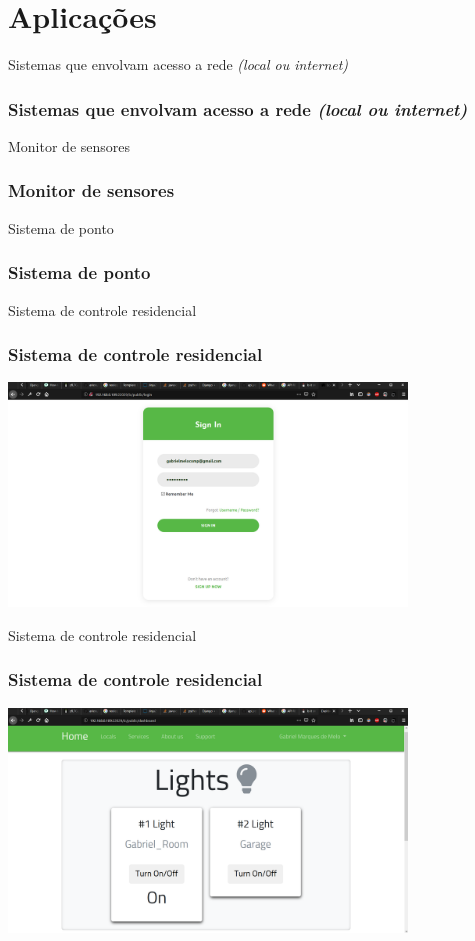 \documentclass[10pt, compress]{beamer}
\begin{document}
\section{Aplicações}

\begin{frame}{Sistemas que envolvam acesso a rede \textit{(local ou internet)}}
  \frametitle{Sistemas que envolvam acesso a rede \textit{(local ou internet)}}
\end{frame}

\begin{frame}{Monitor de sensores}
  \frametitle{Monitor de sensores}
\end{frame}

\begin{frame}{Sistema de ponto}
  \frametitle{Sistema de ponto}
\end{frame}

\begin{frame}{Sistema de controle residencial}
  \frametitle{Sistema de controle residencial}
  \includegraphics[width=300pt]{images/iot-server_login.png}
\end{frame}

\begin{frame}{Sistema de controle residencial}
  \frametitle{Sistema de controle residencial}
  \includegraphics[width=300pt]{images/iot-server_dash1.png}
\end{frame}
\end{document}
